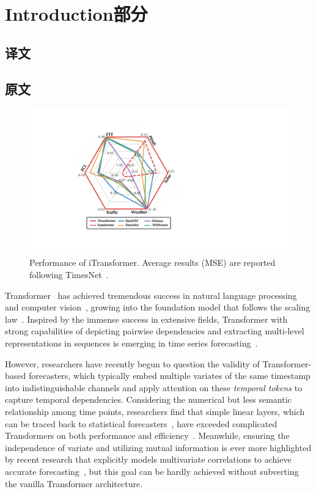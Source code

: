 \documentclass[twoside,12pt]{article}
\begin{document}
\section{Introduction部分}
\subsection{译文}

\subsection{原文}

\begin{figure}[t]
  \begin{center}
    \includegraphics[width=0.5\columnwidth]{pic/radar.pdf}
    \vspace{-10pt}
    \caption{\small{Performance of iTransformer. Average results (MSE) are reported following TimesNet~\citeyearpar{Timesnet}}.}
    \label{fig:radar}
  \end{center}
  \vspace{-14pt}
\end{figure}


Transformer~\citep{Transformer} has achieved tremendous success in natural language processing~\citep{brown2020language} and computer vision~\citep{dosovitskiy2020image}, growing into the foundation model that follows the scaling law~\citep{kaplan2020scaling}. Inspired by the immense success in extensive fields, Transformer with strong capabilities of depicting pairwise dependencies and extracting multi-level representations in sequences is emerging in time series forecasting~\citep{Informer, Autoformer, PatchTST}.


However, researchers have recently begun to question the validity of Transformer-based forecasters, which typically embed multiple variates of the same timestamp into indistinguishable channels and apply attention on these \emph{temporal tokens} to capture temporal dependencies. Considering the numerical but less semantic relationship among time points, researchers find that simple linear layers, which can be traced back to statistical forecasters~\citep{box1968some}, have exceeded complicated Transformers on both performance and efficiency~\citep{DLinear, das2023long}. Meanwhile, ensuring the independence of variate and utilizing mutual information is ever more highlighted by recent research that explicitly models multivariate correlations to achieve accurate forecasting~\citep{Crossformer, TSMixer}, but this goal can be hardly achieved without subverting the vanilla Transformer architecture.
\end{document}

